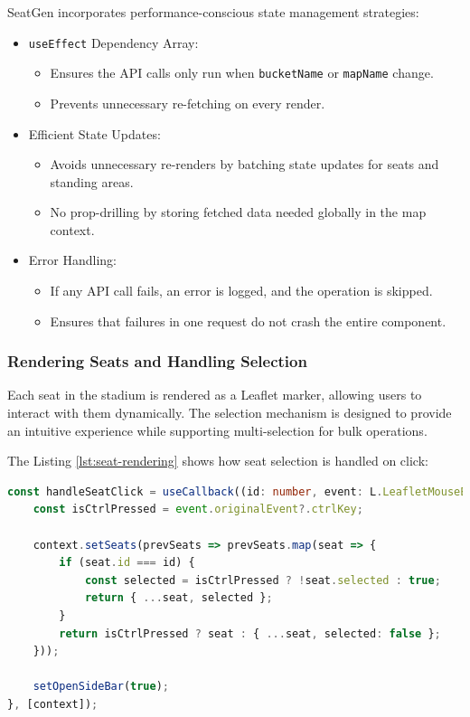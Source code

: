 SeatGen incorporates performance-conscious state management strategies:
\begin{itemize}
    \item \texttt{useEffect} Dependency Array:
    \begin{itemize}
        \item Ensures the API calls only run when \texttt{bucketName} or \texttt{mapName} change.
        \item Prevents unnecessary re-fetching on every render.
    \end{itemize}
    
    \item Efficient State Updates:
    \begin{itemize}
        \item Avoids unnecessary re-renders by batching state updates for seats and standing areas.
        \item No prop-drilling by storing fetched data needed globally in the map context.
    \end{itemize}

    \item Error Handling:
    \begin{itemize}
        \item If any API call fails, an error is logged, and the operation is skipped.
        \item Ensures that failures in one request do not crash the entire component.
    \end{itemize}
\end{itemize}

\subsubsection{Rendering Seats and Handling Selection}

Each seat in the stadium is rendered as a Leaflet marker, allowing users to interact with them dynamically. The selection mechanism is designed to provide an intuitive experience while supporting multi-selection for bulk operations.

The Listing \ref{lst:seat-rendering} shows how seat selection is handled on click:
\begin{lstlisting}[language=TypeScript, caption=Rendering and Selecting Seats, label=lst:seat-rendering]
const handleSeatClick = useCallback((id: number, event: L.LeafletMouseEvent) => {
    const isCtrlPressed = event.originalEvent?.ctrlKey;

    context.setSeats(prevSeats => prevSeats.map(seat => {
        if (seat.id === id) {
            const selected = isCtrlPressed ? !seat.selected : true;
            return { ...seat, selected };
        }
        return isCtrlPressed ? seat : { ...seat, selected: false };
    }));

    setOpenSideBar(true);
}, [context]);
\end{lstlisting}

